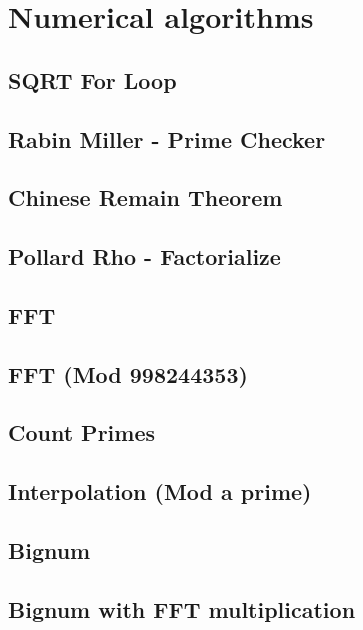 \section{Numerical algorithms}
\subsection{SQRT For Loop}
\raggedbottom
\hrulefill
\subsection{Rabin Miller - Prime Checker}
\raggedbottom
\hrulefill
\subsection{Chinese Remain Theorem}
\raggedbottom
\hrulefill
\subsection{Pollard Rho - Factorialize}
\raggedbottom
\hrulefill
\subsection{FFT}
\raggedbottom
\hrulefill
\subsection{FFT (Mod 998244353)}
\raggedbottom
\hrulefill
\subsection{Count Primes}
\raggedbottom
\hrulefill
\subsection{Interpolation (Mod a prime)}
\raggedbottom
\hrulefill
\subsection{Bignum}
\raggedbottom
\hrulefill
\subsection{Bignum with FFT multiplication}
\raggedbottom
\hrulefill
